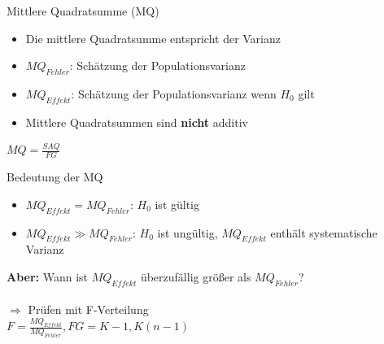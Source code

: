 \documentclass{beamer}
\begin{document}
	\begin{frame}{Mittlere Quadratsumme (MQ)}
		\begin{itemize}\itemsep=2ex
			\item Die mittlere Quadratsumme entspricht der Varianz
			\item $MQ_{Fehler}$: Schätzung der Populationsvarianz
			\item $MQ_{Effekt}$: Schätzung der Populationsvarianz wenn $H_0$ gilt
			\item Mittlere Quadratsummen sind \textbf{nicht} additiv
		\end{itemize}
		\begin{center}
			$MQ = \frac{SAQ}{FG}$
		\end{center}
	\end{frame}
	
	\begin{frame}{Bedeutung der MQ}
		\begin{itemize}\itemsep=2ex
			\item $MQ_{Effekt} = MQ_{Fehler}$: $H_0$ ist gültig
			\item $MQ_{Effekt} \gg MQ_{Fehler}$: $H_0$ ist ungültig, $MQ_{Effekt}$ enthält systematische Varianz
		\end{itemize}
		\begin{center}
			\textbf{Aber:} Wann ist $MQ_{Effekt}$ überzufällig größer als $MQ_{Fehler}$?
			\pause\\ \hfill\\ $\Rightarrow$ Prüfen mit F-Verteilung \vspace{2ex} \\
			$F = \frac{MQ_{Effekt}}{MQ_{Fehler}}, FG=K-1,K(n-1)$
		\end{center}
	\end{frame}
	
\end{document}

